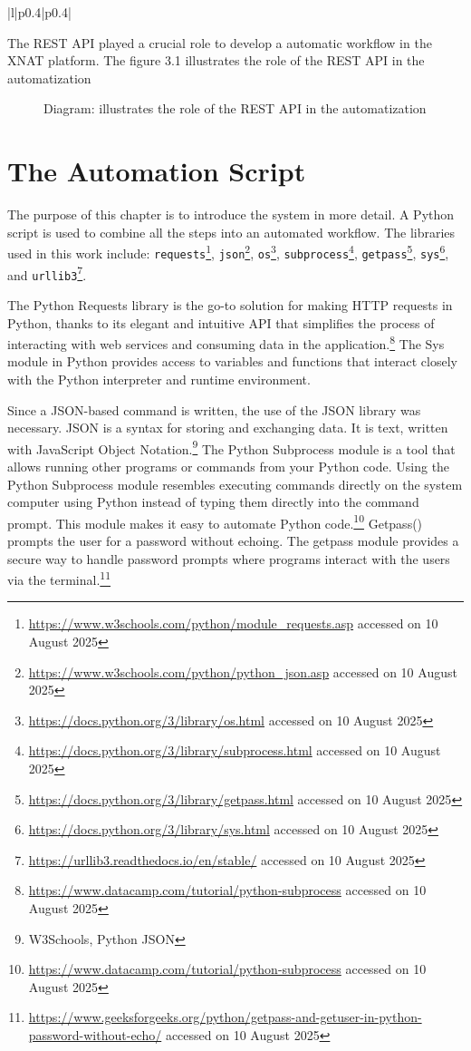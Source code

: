 \begin{longtable}{|l|p{0.4\textwidth}|p{0.4\textwidth}|}
\end{longtable}
The REST API played a crucial role to develop a automatic workflow in the XNAT platform. The figure 3.1 illustrates the role of the REST API in the automatization


\begin{figure}[H]
    \centering
    \def\svgwidth{0.9\linewidth}
    
    \caption{Diagram: illustrates the role of the REST API in the automatization}
    \label{fig:workflow-steps}
\end{figure}

\section{The Automation Script}
The purpose of this chapter is to introduce the system in more detail. A Python script is used to combine all the steps into an automated workflow. The libraries used in this work include: \texttt{requests}\footnote{\url{https://www.w3schools.com/python/module_requests.asp} accessed on 10 August 2025}, \texttt{json}\footnote{\url{https://www.w3schools.com/python/python_json.asp} accessed on 10 August 2025}, \texttt{os}\footnote{\url{https://docs.python.org/3/library/os.html} accessed on 10 August 2025}, \texttt{subprocess}\footnote{\url{https://docs.python.org/3/library/subprocess.html} accessed on 10 August 2025}, \texttt{getpass}\footnote{\url{https://docs.python.org/3/library/getpass.html} accessed on 10 August 2025}, \texttt{sys}\footnote{\url{https://docs.python.org/3/library/sys.html} accessed on 10 August 2025}, and \texttt{urllib3}\footnote{\url{https://urllib3.readthedocs.io/en/stable/} accessed on 10 August 2025}.

The Python Requests library is the go-to solution for making \ac{HTTP} requests in Python, thanks to its elegant and intuitive API that simplifies the process of interacting with web services and consuming data in the application.\footnote{\url{https://www.datacamp.com/tutorial/python-subprocess} accessed on 10 August 2025} The Sys module in Python provides access to variables and functions that interact closely with the Python interpreter and runtime environment.

Since a JSON-based command is written, the use of the JSON library was necessary. JSON is a syntax for storing and exchanging data. It is text, written with JavaScript Object Notation.\footnote{W3Schools, Python JSON}
The Python Subprocess module is a tool that allows running other programs or commands from your Python code. Using the Python Subprocess module resembles executing commands directly on the system computer using Python instead of typing them directly into the command prompt. This module makes it easy to automate Python code.\footnote{\url{https://www.datacamp.com/tutorial/python-subprocess} accessed on 10 August 2025}
Getpass() prompts the user for a password without echoing. The getpass module provides a secure way to handle password prompts where programs interact with the users via the terminal.\footnote{\url{https://www.geeksforgeeks.org/python/getpass-and-getuser-in-python-password-without-echo/} accessed on 10 August 2025}

